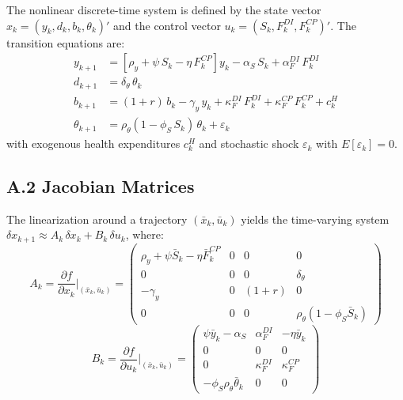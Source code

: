 \documentclass[12pt, a4paper]{article}
\begin{document}
The nonlinear discrete-time system is defined by the state vector $x_k = (y_k, d_k, b_k, \theta_k)'$ and the control vector $u_k = (S_k, F_k^{DI}, F_k^{CP})'$. The transition equations are:
%
\begin{align}
    y_{k+1} &= \left[\rho_y + \psi \, S_k - \eta \, F_k^{CP}\right] y_k
      - \alpha_S \, S_k + \alpha_F^{DI} \, F_k^{DI}
    \label{eq:y_trans} \\[6pt]
    d_{k+1} &= \delta_\theta \, \theta_k
    \label{eq:d_trans} \\[6pt]
    b_{k+1} &= (1+r) \, b_k - \gamma_y \, y_k
      + \kappa_F^{DI} \, F_k^{DI} + \kappa_F^{CP} \, F_k^{CP} + c_k^{H}
    \label{eq:b_trans} \\[6pt]
    \theta_{k+1} &= \rho_\theta (1 - \phi_S \, S_k) \, \theta_k + \varepsilon_k
    \label{eq:theta_trans}
\end{align}
%
with exogenous health expenditures $c_k^H$ and stochastic shock $\varepsilon_k$ with $E[\varepsilon_k] = 0$.

\subsection*{A.2 Jacobian Matrices}

The linearization around a trajectory $(\bar{x}_k, \bar{u}_k)$ yields the time-varying system $\delta x_{k+1} \approx A_k \, \delta x_k + B_k \, \delta u_k$, where:
%
\begin{equation}
    A_k = \frac{\partial f}{\partial x_k} \bigg|_{(\bar{x}_k, \bar{u}_k)} =
    \begin{pmatrix}
        \rho_y + \psi \bar{S}_k - \eta \bar{F}_k^{CP} & 0 & 0 & 0 \\
        0 & 0 & 0 & \delta_\theta \\
        -\gamma_y & 0 & (1+r) & 0 \\
        0 & 0 & 0 & \rho_\theta(1 - \phi_S \bar{S}_k)
    \end{pmatrix}
    \label{eq:A_k}
\end{equation}
%
\begin{equation}
    B_k = \frac{\partial f}{\partial u_k} \bigg|_{(\bar{x}_k, \bar{u}_k)} =
    \begin{pmatrix}
        \psi \bar{y}_k - \alpha_S & \alpha_F^{DI} & -\eta \bar{y}_k \\
        0 & 0 & 0 \\
        0 & \kappa_F^{DI} & \kappa_F^{CP} \\
        -\phi_S \rho_\theta \bar{\theta}_k & 0 & 0
    \end{pmatrix}
    \label{eq:B_k}
\end{equation}
\end{document}
